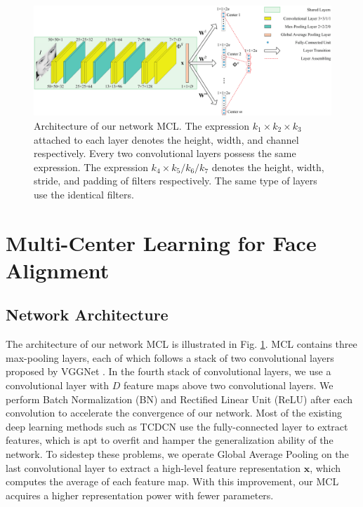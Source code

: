 \documentclass[journal]{IEEEtran}
\begin{document}
\begin{figure}[!htb]
\centering\includegraphics[width=17cm]{network_structure}
\caption{Architecture of our network MCL. The expression $k_1 \times k_2 \times k_3$ attached to each layer denotes the height, width, and channel respectively. Every two convolutional layers possess the same expression. The expression $k_4 \times k_5 / k_6 / k_7$ denotes the height, width, stride, and padding of filters respectively. The same type of layers use the identical filters.}
\label{fig:netstruc}
\end{figure}

\section{Multi-Center Learning for Face Alignment}
\label{sec:mcnet}

\subsection{Network Architecture}
\label{ssec:network}

The architecture of our network MCL is illustrated in Fig. \ref{fig:netstruc}. MCL contains three max-pooling layers, each of which follows a stack of two convolutional layers proposed by VGGNet \cite{simonyan2014very}. In the fourth stack of convolutional layers, we use a convolutional layer with $D$ feature maps above two convolutional layers. We perform Batch Normalization (BN) \cite{ioffe2015batch} and Rectified Linear Unit (ReLU) \cite{nair2010rectified} after each convolution to accelerate the convergence of our network. Most of the existing deep learning methods such as TCDCN \cite{zhang2014facial,zhang2015learning} use the fully-connected layer to extract features, which is apt to overfit and hamper the generalization ability of the network. To sidestep these problems, we operate Global Average Pooling \cite{lin2013network} on the last convolutional layer to extract a high-level feature representation $\mathbf{x}$, which computes the average of each feature map. With this improvement, our MCL acquires a higher representation power with fewer parameters.
\end{document}
